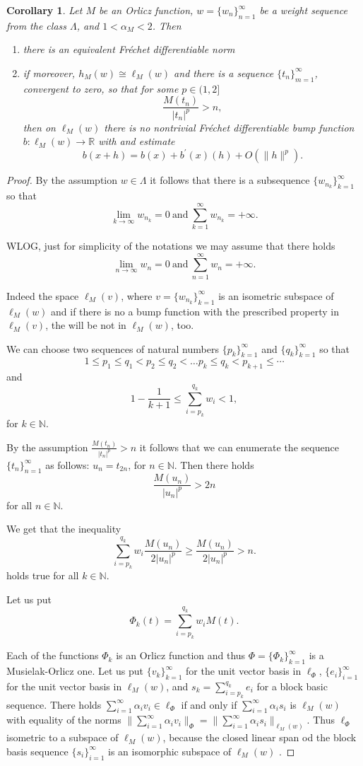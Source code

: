\documentclass[12pt]{article}
\theoremstyle{thmstyleone}%
\newtheorem{cor}[theorem]{Corollary}%
\theoremstyle{thmstyletwo}%
\theoremstyle{thmstylethree}%
\begin{document}
{{\begin{cor}\label{corollary:20}
	Let $M$ be an Orlicz function, $w=\{w_n\}_{n=1}^\infty$ be a weight sequence from the class $\Lambda$,
	and $1< \alpha_M<2$.  Then 
	\begin{enumerate}
		\item there is an equivalent Fr\'{e}chet differentiable norm
		\item if moreover, $h_M(w)\cong\ell_M(w)$ and there is 
		a sequence $\{t_n\}_{m=1}^\infty$, convergent to zero, so that for some $p\in (1,2]$
		$$
		\frac{M(t_n)}{|t_n|^p}>n,
		$$ 
		then on $\ell_M(w)$ there is no nontrivial Fr\'{e}chet differentiable bump function $b:\ell_M(w)\to\mathbb{R}$ with and estimate
		$$
		b(x+h)=b(x)+b^{\prime}(x)(h)+O(\|h\|^p).
		$$
	\end{enumerate} 
\end{cor}
\begin{proof}
	By the assumption $w\in\Lambda$ it follows that there is a subsequence $\{w_{n_k}\}_{k=1}^\infty$ so that
	$$
	\lim_{k\to\infty}w_{n_k}=0\ \mbox{and}\ \sum_{k=1}^\infty w_{n_k}=+\infty.
	$$ 
	
	WLOG, just for simplicity of the notations we may assume that there holds 
	$$
	\lim_{n\to\infty}w_{n}=0\ \mbox{and}\ \sum_{n=1}^\infty w_{n}=+\infty.
	$$ 
	
	{Indeed the space $\ell_M(v)$, where $v=\{w_{n_k}\}_{k=1}^\infty$ is an isometric subspace of $\ell_M(w)$ and if there is no a bump function with the prescribed property in $\ell_M(v)$, the will be not in $\ell_M(w)$, too}. 
	
	We can choose two sequences of natural numbers $\{p_k\}_{k=1}^\infty$ and $\{q_k\}_{k=1}^\infty$
	so that 
	$$
	1\leq p_1\leq q_1<p_2\leq q_2<\dots p_{k}\leq q_{k}<p_{k+1}\leq\cdots
	$$ 
	and
	$$
	1-\frac{1}{k+1}\leq \sum_{i=p_{k}}^{q_k}w_i<1,
	$$
	for $k\in\mathbb{N}$.
	
	By the assumption $\frac{M(t_n)}{|t_n|^p}>n$ it follows that we can enumerate the sequence $\{t_n\}_{n=1}^\infty$ as follows: $u_n=t_{2n}$, for $n\in\mathbb{N}$. Then there holds
	$$
	\frac{M(u_n)}{|u_n|^p}>2n
	$$
	for all $n\in\mathbb{N}$. 
	
	We get that the inequality
	$$
	\sum_{i=p_{k}}^{q_k}w_i\frac{M(u_n)}{2|u_n|^p}\geq \frac{M(u_n)}{2|u_n|^p}>n.
	$$
	holds true for all $k\in\mathbb{N}$. 
	
	Let us put 
	$$
	\Phi_k(t)=\sum_{i=p_{k}}^{q_k}w_iM(t).
	$$
	
	Each of the functions $\Phi_k$ is an Orlicz function and thus $\Phi=\{\Phi_k\}_{k=1}^\infty$ is a Musielak-Orlicz one. Let us put $\{v_k\}_{k=1}^\infty$ for the unit vector basis in $\ell_\Phi$, $\{e_i\}_{i=1}^\infty$ for the unit vector basis in $\ell_M(w)$, and $s_k=\sum_{i=p_k}^{q_k}e_i$ for a block basic sequence. There holds $\sum_{i=1}^\infty\alpha_i v_i\in\ell_\Phi$ if and only if $\sum_{i=1}^\infty\alpha_is_i$ is $\ell_M(w)$ with equality of the norms $\|\sum_{i=1}^\infty\alpha_i v_i\|_\Phi=\|\sum_{i=1}^\infty\alpha_is_i\|_{\ell_M(w)}$. Thus $\ell_\Phi$ isometric to a subspace of $\ell_M(w)$, because the closed linear span od the block basis sequence $\{s_i\}_{i=1}^\infty$ is an isomorphic subspace of $\ell_M(w)$ \cite{Lindenstrauss-Tzafriri}.
	

\end{proof}}}
\end{document}
